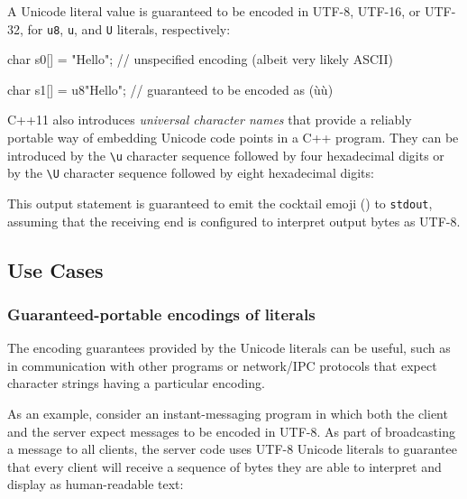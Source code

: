 \noindent A Unicode literal value is guaranteed to be encoded in UTF-8, UTF-16, or
UTF-32, for \lstinline!u8!, \lstinline!u!, and \lstinline!U! literals,
respectively:

\begin{emcppslisting}
char s0[] = "Hello";
    // unspecified encoding (albeit very likely ASCII)

char s1[] = u8"Hello";
    // guaranteed to be encoded as (ù{}ù)
\end{emcppslisting}
    
\noindent C++11 also introduces \emph{universal character names} that provide a
reliably portable way of embedding Unicode code points in a C++ program.
They can be introduced by the \lstinline!\u! character
sequence followed by four hexadecimal digits or by the
\lstinline!\U! character sequence followed by eight
hexadecimal digits:

\begin{emcppslisting}
#include <cstdio>  // (ù{ù)                                               
void f()                                                                        
{                                                                               
    std::puts(u8"\U0001F378"); // Unicode code point in a UTF8 encoded literal  
}
\end{emcppslisting}
    
\noindent This output statement is guaranteed to emit the cocktail emoji
(\martini) to \lstinline!stdout!, assuming that the receiving end is configured to
interpret output bytes as UTF-8.

\subsection[Use Cases]{Use Cases}\label{use-cases}

\subsubsection[Guaranteed-portable encodings of literals]{Guaranteed-portable encodings of literals}\label{guaranteed-portable-encodings-of-literals}

The encoding guarantees provided by the Unicode literals can be useful,
such as in communication with other programs or network/IPC protocols that
expect character strings having a particular encoding.

As an example, consider an instant-messaging program in which both the
client and the server expect messages to be encoded in UTF-8. As part of
broadcasting a message to all clients, the server code uses UTF-8
Unicode literals to guarantee that every client will receive a sequence
of bytes they are able to interpret and display as human-readable text:

